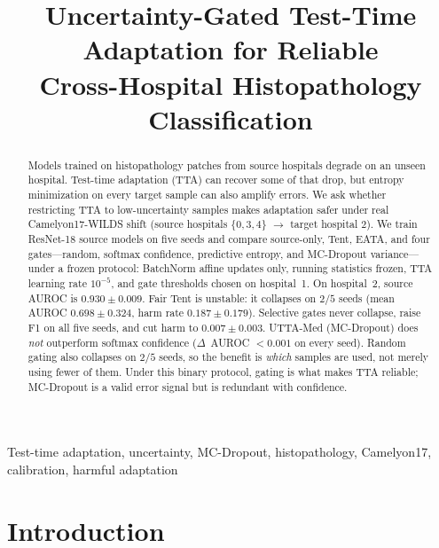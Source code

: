 \documentclass[conference]{IEEEtran}
\begin{document}
\title{Uncertainty-Gated Test-Time Adaptation for Reliable\\
Cross-Hospital Histopathology Classification}

\author{
}

\maketitle

\begin{abstract}
Models trained on histopathology patches from source hospitals degrade on an unseen hospital.
Test-time adaptation (TTA) can recover some of that drop, but entropy minimization on every target sample can also amplify errors.
We ask whether restricting TTA to low-uncertainty samples makes adaptation safer under real Camelyon17-WILDS shift (source hospitals $\{0,3,4\}$ $\rightarrow$ target hospital $2$).
We train ResNet-18 source models on five seeds and compare source-only, Tent, EATA, and four gates---random, softmax confidence, predictive entropy, and MC-Dropout variance---under a frozen protocol: BatchNorm affine updates only, running statistics frozen, TTA learning rate $10^{-5}$, and gate thresholds chosen on hospital~1.
On hospital~2, source AUROC is $0.930\pm0.009$.
Fair Tent is unstable: it collapses on $2/5$ seeds (mean AUROC $0.698\pm0.324$, harm rate $0.187\pm0.179$).
Selective gates never collapse, raise F1 on all five seeds, and cut harm to $0.007\pm0.003$.
UTTA-Med (MC-Dropout) does \emph{not} outperform softmax confidence ($\Delta$~AUROC $<0.001$ on every seed).
Random gating also collapses on $2/5$ seeds, so the benefit is \emph{which} samples are used, not merely using fewer of them.
Under this binary protocol, gating is what makes TTA reliable; MC-Dropout is a valid error signal but is redundant with confidence.
\end{abstract}

\begin{IEEEkeywords}
Test-time adaptation, uncertainty, MC-Dropout, histopathology, Camelyon17, calibration, harmful adaptation
\end{IEEEkeywords}

\section{Introduction}
\end{document}
